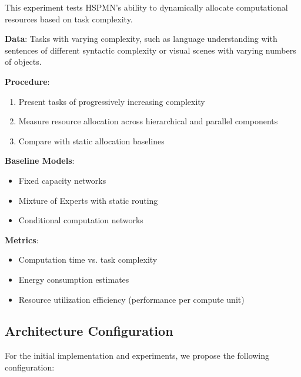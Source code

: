 \documentclass[11pt,a4paper,twocolumn]{article}
\begin{document}
This experiment tests HSPMN's ability to dynamically allocate computational resources based on task complexity.

\textbf{Data}: Tasks with varying complexity, such as language understanding with sentences of different syntactic complexity or visual scenes with varying numbers of objects.

\textbf{Procedure}:
\begin{enumerate}
    \item Present tasks of progressively increasing complexity
    \item Measure resource allocation across hierarchical and parallel components
    \item Compare with static allocation baselines
\end{enumerate}

\textbf{Baseline Models}:
\begin{itemize}
    \item Fixed capacity networks
    \item Mixture of Experts with static routing
    \item Conditional computation networks
\end{itemize}

\textbf{Metrics}:
\begin{itemize}
    \item Computation time vs. task complexity
    \item Energy consumption estimates
    \item Resource utilization efficiency (performance per compute unit)
\end{itemize}

\subsection{Architecture Configuration}

For the initial implementation and experiments, we propose the following configuration:
\end{document}
